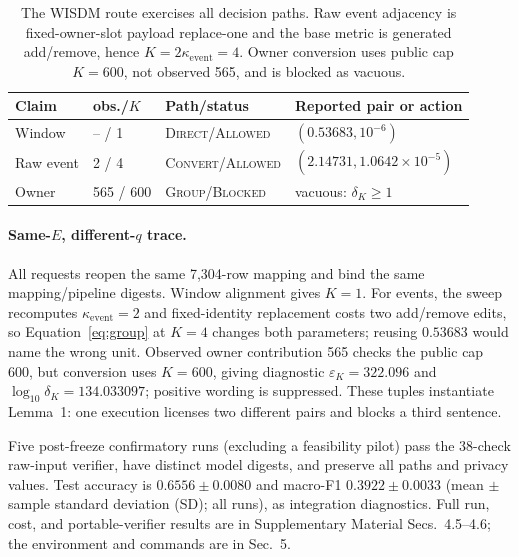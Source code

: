 \documentclass[letterpaper]{article} %
\newcommand{\Direct}{\textsc{Direct}}
\newcommand{\Convert}{\textsc{Convert}}
\newcommand{\Group}{\textsc{Group}}
\newcommand{\Allowed}{\textsc{Allowed}}
\newcommand{\Blocked}{\textsc{Blocked}}
\newcommand{\ke}{\kappa_{\mathrm{event}}}
\begin{document}
\begin{table}[t]
\centering
\begin{tabular}{@{}llll@{}}
\hline
Claim & obs./$K$ & Path/status & Reported pair or action \\
\hline
Window & -- / 1 & \Direct/\Allowed & $(0.53683,10^{-6})$ \\
Raw event & 2 / 4 & \Convert/\Allowed & $(2.14731,1.0642{\times}10^{-5})$ \\
Owner & 565 / 600 & \Group/\Blocked & vacuous: $\delta_K\geq1$ \\
\hline
\end{tabular}
\caption{The WISDM route exercises all decision paths. Raw event adjacency is fixed-owner-slot payload replace-one and the base metric is generated add/remove, hence $K=2\ke=4$. Owner conversion uses public cap $K=600$, not observed 565, and is blocked as vacuous.}
\label{tab:wisdm}
\end{table}

\paragraph{Same-$E$, different-$q$ trace.}
All requests reopen the same 7,304-row mapping and bind the same mapping/pipeline digests. Window alignment gives $K=1$. For events, the sweep recomputes $\ke=2$ and fixed-identity replacement costs two add/remove edits, so Equation~\eqref{eq:group} at $K=4$ changes both parameters; reusing $0.53683$ would name the wrong unit. Observed owner contribution 565 checks the public cap 600, but conversion uses $K=600$, giving diagnostic $\varepsilon_K=322.096$ and $\log_{10}\delta_K=134.033097$; positive wording is suppressed. These tuples instantiate Lemma~1: one execution licenses two different pairs and blocks a third sentence.

Five post-freeze confirmatory runs (excluding a feasibility pilot) pass the 38-check raw-input verifier, have distinct model digests, and preserve all paths and privacy values. Test accuracy is $0.6556\pm0.0080$ and macro-F1 $0.3922\pm0.0033$ (mean $\pm$ sample standard deviation (SD); all runs), as integration diagnostics. Full run, cost, and portable-verifier results are in Supplementary Material Secs.~4.5--4.6; the environment and commands are in Sec.~5.
\end{document}

